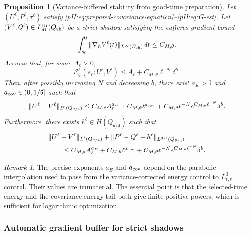 \documentclass[11pt]{article}
\numberwithin{equation}{section}
\theoremstyle{plain}
\newtheorem{proposition}{Proposition}[section]
\theoremstyle{definition}
\theoremstyle{remark}
\newtheorem{remark}{Remark}[section]
\newcommand{\str}{\mathrm{str}}
\newcommand{\dt}{\,dt}
\begin{document}
\begin{proposition}[Variance-buffered stability from good-time preparation]\label{pII:prop:variance-buffered}
Let $(U^\ell,P^\ell,\tau^\ell)$ satisfy \eqref{pII:eq:prepared-covariance-equation}--\eqref{pII:eq:G-est}.  Let $(V^\ell,Q^\ell)\in L_M^{\str}(Q_{\rm sh})$ be a strict shadow satisfying the buffered gradient bound
\begin{equation}\label{pII:eq:buffered-gradient}
        \int_{s_\ell}^{0}\|\nabla_hV^\ell(t)\|_{L^\infty(B_{\rm sh})}\dt
        \le C_{M,\theta}.
\end{equation}
Assume that, for some $A_\ell>0$,
\begin{equation}\label{pII:eq:good-time-energy-assumption}
        \mathcal E_\varphi^\ell(s_\ell;U^\ell,V^\ell)
        \le A_\ell+C_{M,\theta}\ell^{-N}\delta^b.
\end{equation}
Then, after possibly increasing $N$ and decreasing $b$, there exist $a_E>0$ and $a_{\rm cov}\in(0,1/6]$ such that
\begin{equation}\label{pII:eq:velocity-stability}
        \|U^\ell-V^\ell\|_{L^3(Q_{\theta/4})}
        \le C_{M,\theta}A_\ell^{a_E}
        +C_{M,\theta}\ell^{a_{\rm cov}}
        +C_{M,\theta}\ell^{-N}e^{C_{M,\theta}\ell^{-N}}\delta^b.
\end{equation}
Furthermore, there exists $h^\ell\in H(Q_{\theta/4})$ such that
\begin{equation}\label{pII:eq:pressure-stability}
\begin{aligned}
        &\|U^\ell-V^\ell\|_{L^3(Q_{\theta/4})}
        +\|P^\ell-Q^\ell-h^\ell\|_{L^{3/2}(Q_{\theta/4})} \\
        &\qquad\le C_{M,\theta}A_\ell^{a_E}
        +C_{M,\theta}\ell^{a_{\rm cov}}
        +C_{M,\theta}\ell^{-N}e^{C_{M,\theta}\ell^{-N}}\delta^b.
\end{aligned}
\end{equation}
\end{proposition}

\begin{remark}
The precise exponents $a_E$ and $a_{\rm cov}$ depend on the parabolic interpolation used to pass from the variance-corrected energy control to $L^3_{t,x}$ control.  Their values are immaterial.  The essential point is that the selected-time energy and the covariance energy tail both give finite positive powers, which is sufficient for logarithmic optimization.
\end{remark}


\subsubsection{Automatic gradient buffer for strict shadows}
\end{document}
